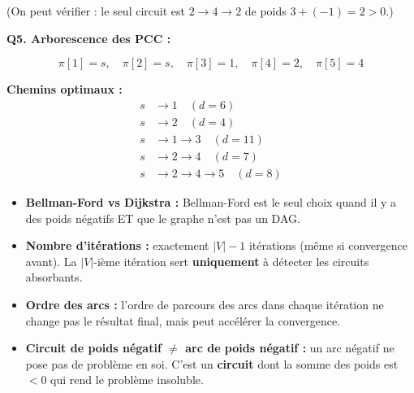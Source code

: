 \documentclass[12pt,a4paper]{article}
\begin{document}
\begin{correction}
(On peut v\'erifier : le seul circuit est $2 \to 4 \to 2$ de poids $3 + (-1) = 2 > 0$.)

\medskip
\textbf{Q5. Arborescence des PCC :}

$$\pi[1]=s,\quad \pi[2]=s,\quad \pi[3]=1,\quad \pi[4]=2,\quad \pi[5]=4$$

\begin{center}
\end{center}

\textbf{Chemins optimaux :}
\begin{align*}
s &\to 1 \quad (d=6) \\
s &\to 2 \quad (d=4) \\
s &\to 1 \to 3 \quad (d=11) \\
s &\to 2 \to 4 \quad (d=7) \\
s &\to 2 \to 4 \to 5 \quad (d=8)
\end{align*}
\end{correction}

\begin{attention}
\begin{itemize}
    \item \textbf{Bellman-Ford vs Dijkstra :} Bellman-Ford est le seul choix quand il y a des poids n\'egatifs ET que le graphe n'est pas un DAG.
    \item \textbf{Nombre d'it\'erations :} exactement $|V|-1$ it\'erations (m\^eme si convergence avant). La $|V|$-i\`eme it\'eration sert \textbf{uniquement} \`a d\'etecter les circuits absorbants.
    \item \textbf{Ordre des arcs :} l'ordre de parcours des arcs dans chaque it\'eration ne change pas le r\'esultat final, mais peut acc\'el\'erer la convergence.
    \item \textbf{Circuit de poids n\'egatif $\neq$ arc de poids n\'egatif :} un arc n\'egatif ne pose pas de probl\`eme en soi. C'est un \textbf{circuit} dont la somme des poids est $< 0$ qui rend le probl\`eme insoluble.
\end{itemize}
\end{attention}
\end{document}
